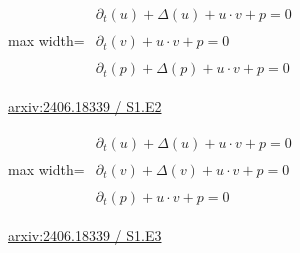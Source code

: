 \documentclass[10pt,a4paper]{article}
\begin{document}
\begin{minipage}{\linewidth}
\begin{center}\begin{adjustbox}{max width=\linewidth}$\displaystyle\begin{gathered}\begin{gathered}\partial_{t}(u)+\Delta(u)+u\cdot v+p=0\end{gathered}\\[5pt]\begin{gathered}\partial_{t}(v)+u\cdot v+p=0\end{gathered}\\[5pt]\begin{gathered}\partial_{t}(p)+\Delta(p)+u\cdot v+p=0\end{gathered}\end{gathered}$\end{adjustbox}\end{center}
{\small \href{https://arxiv.org/html/2406.18339#S1.E2}{arxiv:2406.18339 / S1.E2}}\par
\end{minipage}\par\vspace{7mm}

\begin{minipage}{\linewidth}
\begin{center}\begin{adjustbox}{max width=\linewidth}$\displaystyle\begin{gathered}\begin{gathered}\partial_{t}(u)+\Delta(u)+u\cdot v+p=0\end{gathered}\\[5pt]\begin{gathered}\partial_{t}(v)+\Delta(v)+u\cdot v+p=0\end{gathered}\\[5pt]\begin{gathered}\partial_{t}(p)+u\cdot v+p=0\end{gathered}\end{gathered}$\end{adjustbox}\end{center}
{\small \href{https://arxiv.org/html/2406.18339#S1.E3}{arxiv:2406.18339 / S1.E3}}\par
\end{minipage}\par\vspace{7mm}
\end{document}
